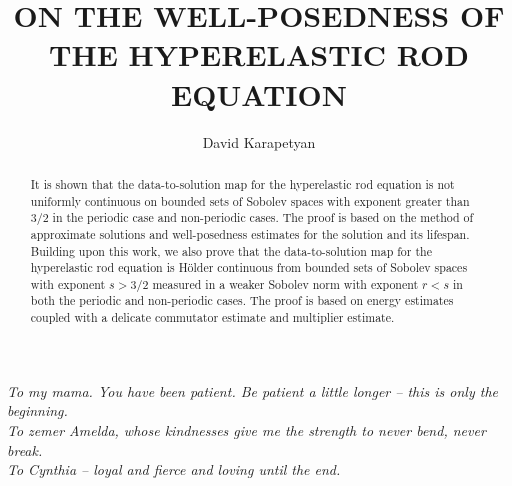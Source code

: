 \documentclass[final,noinfo]{thesis}
\begin{document}
\frontmatter         %
\title{\vspace{0.3in}ON THE WELL-POSEDNESS OF THE HYPERELASTIC ROD EQUATION}
\author{David Karapetyan}
\degprior{}
\maketitle           

\makecopyright      %

\begin{abstract}
It is shown that the data-to-solution map
for the hyperelastic rod equation is not
uniformly continuous on bounded sets of Sobolev spaces with exponent greater
than $3/2$ in the periodic case and non-periodic cases. The proof is based on the
method of approximate solutions and well-posedness estimates for the solution
and its lifespan. Building upon this work, we also prove that the data-to-solution map for the hyperelastic rod equation is H\"older continuous from
bounded sets of Sobolev spaces with exponent $s > 3/2$ measured in a weaker
Sobolev norm with exponent $r < s$ in both the periodic and non-periodic cases.
The proof is based on energy estimates coupled with a delicate commutator
estimate and multiplier estimate.
\end{abstract}

\renewcommand{\dedicationname}{\mbox{}} %
 \begin{dedication}
   \emph{To my mama. You have been patient. Be patient a little longer -- this is only the
   beginning. 
   \\
   \vspace{0.2in}
   To zemer Amelda, whose kindnesses
give me the strength to never bend, never break.
\\
\vspace{0.2in}
To Cynthia -- loyal and fierce and loving until the end. 
}
\end{dedication}
\end{document}
